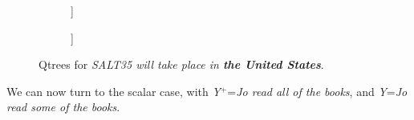 \begin{figure}[H]
	\centering
	\begin{subfigure}[b]{.3\linewidth}
		\centering
		\begin{forest}
			[CS[\bfbox{France}][$\neg$France]]
		\end{forest}
		\caption{}\label{tree:france-polar}
	\end{subfigure}
	\qquad
	\begin{subfigure}[b]{.3\linewidth}
		\centering
		\begin{forest}
			[CS[\bfbox{France}][UK][...]]
		\end{forest}
		\caption{}\label{tree:france-wh}
	\end{subfigure}
	\caption{Qtrees for \textit{SALT35 will take place in \textbf{the United States}}.}
\end{figure}

We can now turn to the scalar case, with \textit{Y}$^+$=\textit{Jo read all of the books}, and \textit{Y}=\textit{Jo read some of the books}.

